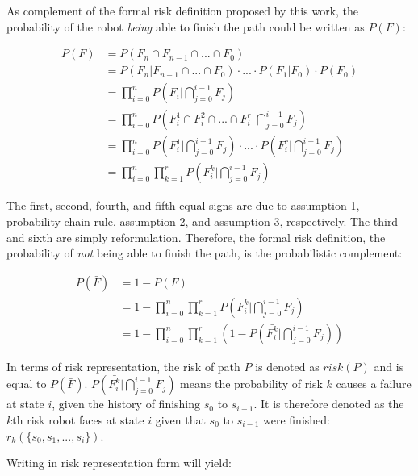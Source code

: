 \documentclass[letterpaper]{article} %
\begin{document}
As complement of the formal risk definition proposed by this work, the probability of the robot \emph{being} able to finish the path could be written as $P(F)$:

\begin{equation}
\begin{split}
P(F)
&= P(F_n\cap F_{n-1} \cap ... \cap F_0) \\
&= P(F_n \vert F_{n-1} \cap ... \cap F_0) \cdot ... \cdot P(F_1 \vert F_0) \cdot P(F_0)\\
&= \prod_{i=0}^{n} P(F_i \vert \bigcap_{j=0}^{i-1} F_j) \\
& = \prod_{i=0}^{n} P(F_i^1 \cap F_i^2 \cap ... \cap F_i^r \vert \bigcap_{j=0}^{i-1} F_j) \\
& = \prod_{i=0}^{n} P(F_i^1 \vert \bigcap_{j=0}^{i-1} F_j) \cdot ... \cdot P(F_i^r \vert \bigcap_{j=0}^{i-1} F_j) \\
& = \prod_{i=0}^{n} \prod_{k=1}^{r} P(F_i^k\vert \bigcap_{j=0}^{i-1} F_j)
\end{split}
\end{equation}

The first, second, fourth, and fifth equal signs are due to assumption 1, probability chain rule, assumption 2, and assumption 3, respectively. The third and sixth are simply reformulation. Therefore, the formal risk definition, the probability of \emph{not} being able to finish the path, is the probabilistic complement:

\begin{equation}
\begin{split}
P(\bar{F})
&= 1 - P(F) \\
&= 1 - \prod_{i=0}^{n} \prod_{k=1}^{r} P(F_i^k \vert \bigcap_{j=0}^{i-1} F_j) \\
&= 1 - \prod_{i=0}^{n} \prod_{k=1}^{r} (1-P(\bar{F_i^k} \vert \bigcap_{j=0}^{i-1} F_j))
\end{split}
\label{eqn::pfbar}
\end{equation}

In terms of risk representation, the risk of path $P$ is denoted as $risk(P)$ and is equal to $P(\bar{F})$. $P(\bar{F_i^k} \vert \bigcap\limits_{j=0}^{i-1} F_j)$ means the probability of risk $k$ causes a failure at state $i$, given the history of finishing $s_0$ to $s_{i-1}$. It is therefore denoted as the $k$th risk robot faces at state $i$ given that $s_0$ to $s_{i-1}$ were finished: $r_k(\{s_0, s_1, ..., s_i\})$.

Writing in risk representation form will yield:
\end{document}
